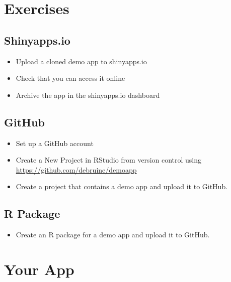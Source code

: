 \documentclass[
  oneside]{book}
\providecommand{\tightlist}{%
  \setlength{\itemsep}{0pt}\setlength{\parskip}{0pt}}
\begin{document}
\hypertarget{exercises-sharing}{%
\section{Exercises}\label{exercises-sharing}}

\hypertarget{shinyapps.io-1}{%
\subsection*{Shinyapps.io}\label{shinyapps.io-1}}

\begin{itemize}
\tightlist
\item
  Upload a cloned demo app to shinyapps.io
\item
  Check that you can access it online
\item
  Archive the app in the shinyapps.io dashboard
\end{itemize}

\hypertarget{github-1}{%
\subsection*{GitHub}\label{github-1}}

\begin{itemize}
\tightlist
\item
  Set up a GitHub account
\item
  Create a New Project in RStudio from version control using \url{https://github.com/debruine/demoapp}
\item
  Create a project that contains a demo app and upload it to GitHub.
\end{itemize}

\hypertarget{r-package}{%
\subsection*{R Package}\label{r-package}}

\begin{itemize}
\tightlist
\item
  Create an R package for a demo app and upload it to GitHub.
\end{itemize}

\hypertarget{your-app-sharing}{%
\section{Your App}\label{your-app-sharing}}
\end{document}
